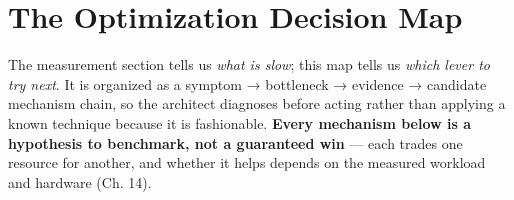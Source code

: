 \section*{The Optimization Decision
Map}\label{the-optimization-decision-map}

The measurement section tells us \emph{what is slow}; this map tells us
\emph{which lever to try next}. It is organized as a symptom →
bottleneck → evidence → candidate mechanism chain, so the architect
diagnoses before acting rather than applying a known technique because
it is fashionable. \textbf{Every mechanism below is a hypothesis to
benchmark, not a guaranteed win} --- each trades one resource for
another, and whether it helps depends on the measured workload and
hardware (Ch. 14).

